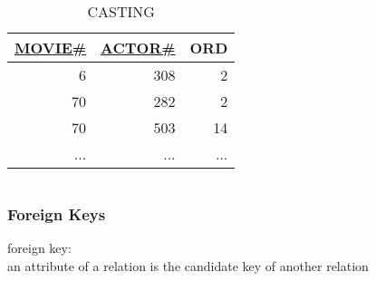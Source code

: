 \documentclass[dvipsnames]{beamer}
\theoremstyle{plain}
\begin{document}
\begin{frame}
\begin{example}
\begin{columns}
      \begin{tiny}
      \begin{table}
        \caption{CASTING}
        \begin{tabular}{|r|r|r|}\hline
\underline{MOVIE\#} & \underline{ACTOR\#} & ORD\\\hline\hline
                  6 &                 308 &   2\\\hline
                 70 &                 282 &   2\\\hline
                 70 &                 503 &  14\\\hline
                ... &                 ... & ...\\\hline
        \end{tabular}
      \end{table}
      \end{tiny}
    \end{columns}
  \end{example}
\end{frame}

\begin{frame}
  \frametitle{Foreign Keys}

  \begin{definition}
    \alert{foreign key}:\\
      an attribute of a relation is the candidate key of another relation
  \end{definition}
\end{frame}
\end{document}
